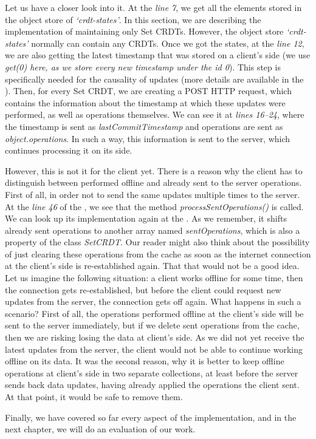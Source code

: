 Let us have a closer look into it. At the \textit{line 7}, we get all the elements stored in the object store of \textit{`crdt-states'}. In this section, we are describing the implementation of maintaining only Set CRDTs. However, the object store \textit{`crdt-states'} normally can contain any CRDTs. Once we got the states, at the \textit{line 12}, we are also getting the latest timestamp that was stored on a client's side (we use \textit{get(0) here, as we store every new timestamp under the id \textit{0}}). This step is specifically needed for the causality of updates (more details are available in the ). Then, for every Set CRDT, we are creating a POST HTTP request, which contains the information about the timestamp at which these updates were performed, as well as operations themselves. We can see it at \textit{lines 16--24}, where the timestamp is sent as \textit{lastCommitTimestamp} and operations are sent as \textit{object.operations}. In such a way, this information is sent to the server, which continues processing it on its side.

However, this is not it for the client yet. There is a reason why the client has to distinguish between performed offline and already sent to the server operations. First of all, in order not to send the same updates multiple times to the server. At the \textit{line 46} of the , we see that the method \textit{processSentOperations()} is called. We can look up its implementation again at the . As we remember, it shifts already sent operations to another array named \textit{sentOperations}, which is also a property of the class \textit{SetCRDT}. Our reader might also think about the possibility of just clearing these operations from the cache as soon as the internet connection at the client's side is re-established again. That that would not be a good idea. Let us imagine the following situation: a client works offline for some time, then the connection gets re-established, but before the client could request new updates from the server, the connection gets off again. What happens in such a scenario? First of all, the operations performed offline at the client's side will be sent to the server immediately, but if we delete sent operations from the cache, then we are risking losing the data at client's side. As we did not yet receive the latest updates from the server, the client would not be able to continue working offline on its data. It was the second reason, why it is better to keep offline operations at client's side in two separate collections, at least before the server sends back data updates, having already applied the operations the client sent. At that point, it would be safe to remove them.

Finally, we have covered so far every aspect of the implementation, and in the next chapter, we will do an evaluation of our work.